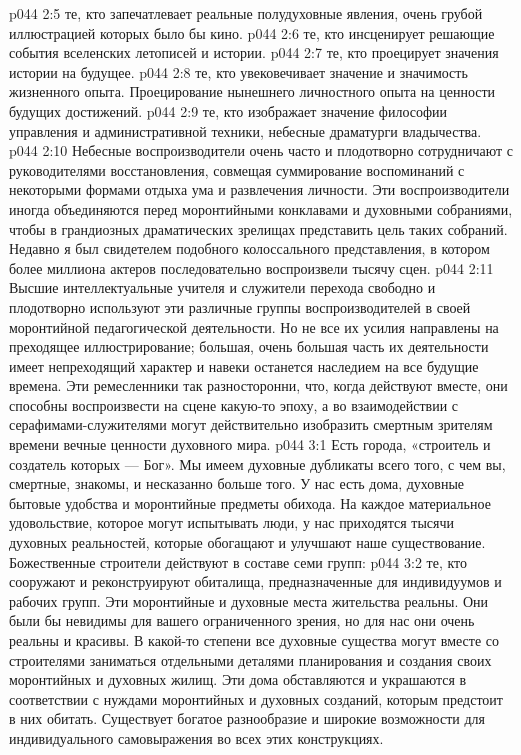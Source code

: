 \vs p044 2:5 \bibnobreakspace {} те, кто запечатлевает реальные полудуховные явления, очень грубой иллюстрацией которых было бы кино.
\vs p044 2:6 \bibnobreakspace {} те, кто инсценирует решающие события вселенских летописей и истории.
\vs p044 2:7 \bibnobreakspace {} те, кто проецирует значения истории на будущее.
\vs p044 2:8 \bibnobreakspace {} те, кто увековечивает значение и значимость жизненного опыта. Проецирование нынешнего личностного опыта на ценности будущих достижений.
\vs p044 2:9 \bibnobreakspace {} те, кто изображает значение философии управления и административной техники, небесные драматурги владычества.
\vs p044 2:10 \pc Небесные воспроизводители очень часто и плодотворно сотрудничают с руководителями восстановления, совмещая суммирование воспоминаний с некоторыми формами отдыха ума и развлечения личности. Эти воспроизводители иногда объединяются перед моронтийными конклавами и духовными собраниями, чтобы в грандиозных драматических зрелищах представить цель таких собраний. Недавно я был свидетелем подобного колоссального представления, в котором более миллиона актеров последовательно воспроизвели тысячу сцен.
\vs p044 2:11 Высшие интеллектуальные учителя и служители перехода свободно и плодотворно используют эти различные группы воспроизводителей в своей моронтийной педагогической деятельности. Но не все их усилия направлены на преходящее иллюстрирование; большая, очень большая часть их деятельности имеет непреходящий характер и навеки останется наследием на все будущие времена. Эти ремесленники так разносторонни, что, когда действуют вместе, они способны воспроизвести на сцене какую\hyp{}то эпоху, а во взаимодействии с серафимами\hyp{}служителями могут действительно изобразить смертным зрителям времени вечные ценности духовного мира.
\vs p044 3:1 Есть города, «строитель и создатель которых --- Бог». Мы имеем духовные дубликаты всего того, с чем вы, смертные, знакомы, и несказанно больше того. У нас есть дома, духовные бытовые удобства и моронтийные предметы обихода. На каждое материальное удовольствие, которое могут испытывать люди, у нас приходятся тысячи духовных реальностей, которые обогащают и улучшают наше существование. Божественные строители действуют в составе семи групп:
\vs p044 3:2 \bibnobreakspace {} те, кто сооружают и реконструируют обиталища, предназначенные для индивидуумов и рабочих групп. Эти моронтийные и духовные места жительства реальны. Они были бы невидимы для вашего ограниченного зрения, но для нас они очень реальны и красивы. В какой\hyp{}то степени все духовные существа могут вместе со строителями заниматься отдельными деталями планирования и создания своих моронтийных и духовных жилищ. Эти дома обставляются и украшаются в соответствии с нуждами моронтийных и духовных созданий, которым предстоит в них обитать. Существует богатое разнообразие и широкие возможности для индивидуального самовыражения во всех этих конструкциях.
